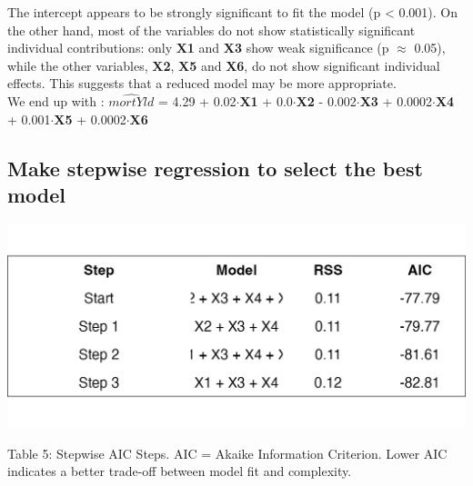 \documentclass[
  12pt,
]{article}
\begin{document}
The intercept appears to be strongly significant to fit the model (p
\textless{} 0.001). On the other hand, most of the variables do not show
statistically significant individual contributions: only \textbf{X1} and
\textbf{X3} show weak significance (p \(\approx\) 0.05), while the other
variables, \textbf{X2}, \textbf{X5} and \textbf{X6}, do not show
significant individual effects. This suggests that a reduced model may
be more appropriate.\\
We end up with : \(\hat{mortYld}\) = 4.29 + 0.02\(\cdot\)\textbf{X1} +
0.0\(\cdot\)\textbf{X2} - 0.002\(\cdot\)\textbf{X3} +
0.0002\(\cdot\)\textbf{X4} + 0.001\(\cdot\)\textbf{X5} +
0.0002\(\cdot\)\textbf{X6}

\subsection{Make stepwise regression to select the best
model}\label{make-stepwise-regression-to-select-the-best-model}

\begin{minipage}{0.48\textwidth}
\centering
\includegraphics[width=\linewidth]{figures/stepwise_aic_table.png}
\vspace{-1em}
\parbox{\linewidth}{\fontsize{12}{14}\selectfont Table 5: Stepwise AIC Steps. AIC = Akaike Information Criterion. Lower AIC indicates a better trade-off between model fit and complexity.}
\end{minipage}
\hfill
{}
\end{document}
